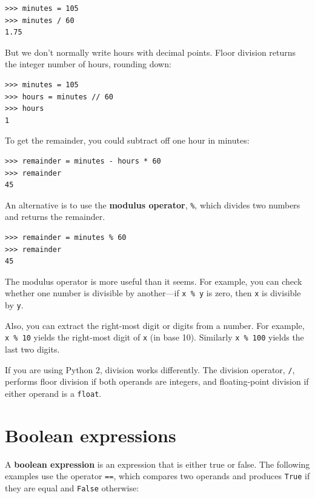 \documentclass[10pt]{book}
\begin{document}
\begin{verbatim}
>>> minutes = 105
>>> minutes / 60
1.75
\end{verbatim}

But we don't normally write hours with decimal points.  Floor
division returns the integer number of hours, rounding down:

\begin{verbatim}
>>> minutes = 105
>>> hours = minutes // 60
>>> hours
1
\end{verbatim}

To get the remainder, you could subtract off one hour in minutes:

\begin{verbatim}
>>> remainder = minutes - hours * 60
>>> remainder
45
\end{verbatim}


An alternative is to use the {\bf modulus operator}, \verb"%", which
divides two numbers and returns the remainder.

\begin{verbatim}
>>> remainder = minutes % 60
>>> remainder
45
\end{verbatim}
%
The modulus operator is more useful than it seems.  For
example, you can check whether one number is divisible by another---if
{\tt x \% y} is zero, then {\tt x} is divisible by {\tt y}.

Also, you can extract the right-most digit
or digits from a number.  For example, {\tt x \% 10} yields the
right-most digit of {\tt x} (in base 10).  Similarly {\tt x \% 100}
yields the last two digits.

If you are using Python 2, division works differently.  The
division operator, \verb"/", performs floor division if both
operands are integers, and floating-point division if either
operand is a {\tt float}.


\section{Boolean expressions}

A {\bf boolean expression} is an expression that is either true
or false.  The following examples use the
operator {\tt ==}, which compares two operands and produces
{\tt True} if they are equal and {\tt False} otherwise:
\end{document}
